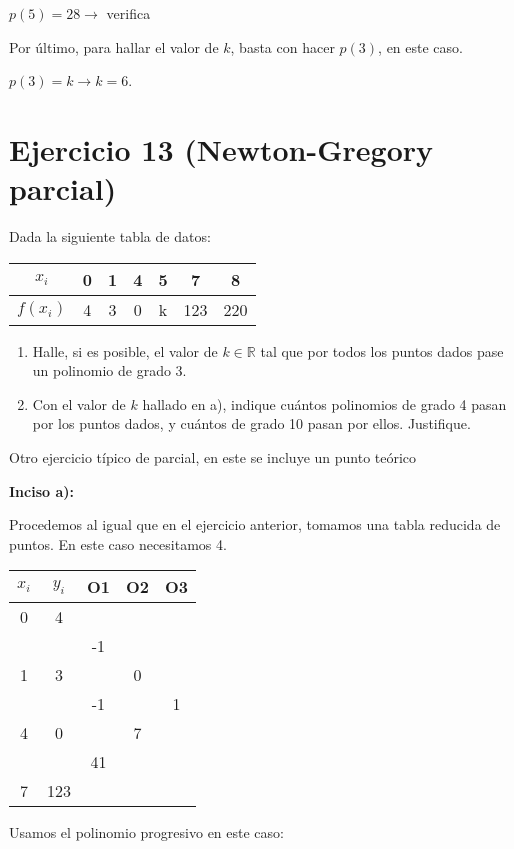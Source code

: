 \documentclass[11pt]{article}
\begin{document}
	$p(5)=28 \rightarrow $ verifica
	
	Por último, para hallar el valor de $k$, basta con hacer $p(3)$, en este caso.
	
	$p(3)=k \rightarrow k=6$.
	
	\section{Ejercicio 13 (Newton-Gregory parcial)}
	Dada la siguiente tabla de datos:
	\begin{center}
		\begin{tabular}{|c|c|c|c|c|c|c|}
			\hline
			$x_i$ & 0 & 1 & 4 & 5 & 7 & 8\\
			\hline
			$f(x_i)$ & 4 & 3 & 0 & k & 123 & 220\\
			\hline
		\end{tabular}
	\end{center}

	\begin{enumerate}[label=\alph*)]
		\item Halle, si es posible, el valor de $k \in \mathbb{R}$ tal que por todos los puntos dados pase un polinomio de grado 3.
		\item Con el valor de $k$ hallado en a), indique cuántos polinomios de grado 4 pasan por los puntos dados, y cuántos de grado 10 pasan por ellos. Justifique.
	\end{enumerate}

	Otro ejercicio típico de parcial, en este se incluye un punto teórico
	
	\textbf{Inciso a):}
	
	Procedemos al igual que en el ejercicio anterior, tomamos una tabla reducida de puntos. En este caso necesitamos 4.
	
	\begin{tabular}{|c c c c c|}
		\hline
		$x_i$ & $y_i$ & O1 & O2 & O3\\
		\hline
		0 & 4 & & & \\
		& & -1 & & \\
		1 & 3  & &0 & \\
		& & -1 & & 1\\
		4 & 0 & & 7 &\\
		& & 41 & & \\
		7 & 123 & & &\\
		\hline
	\end{tabular}

	Usamos el polinomio progresivo en este caso:
	
\end{document}

